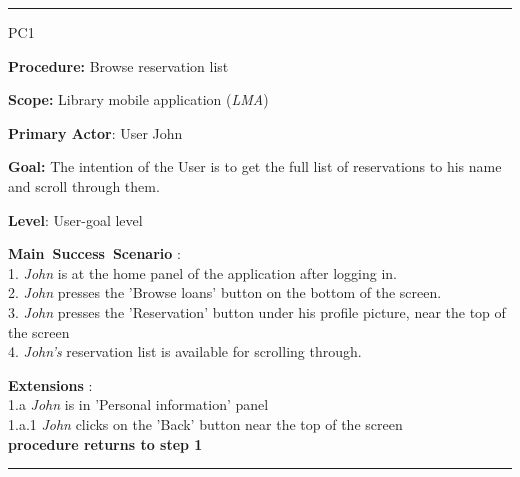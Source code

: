 \vspace{0.5cm}
\hrule
\begin{lyxlist}{PC1}
\small{
\item [\textbf{Procedure:}] Browse reservation list
\item [\textbf{Scope:}] Library mobile application (\emph{LMA})
\item [\textbf{Primary Actor}:] User John
\item [\textbf{Goal:}] The intention of the User is to get the full list of
reservations to his name and scroll through them.
\item [\textbf{Level}:] User-goal level
\item [\textbf{Main~Success~Scenario}]:\\
1. \emph{John} is at the home panel of the application after logging in.\\
2. \emph{John} presses the 'Browse loans' button on the bottom of the screen.\\
3. \emph{John} presses the 'Reservation' button under his profile picture, near
the top of the screen\\
4. \emph{John's} reservation list is available for scrolling
through.\\

\item [\textbf{Extensions}]:\\
1.a \emph{John} is in 'Personal information' panel\\
\hspace*{0.5cm} 1.a.1 \emph{John} clicks on the 'Back' button near the top of
the screen\\
\hspace*{0.5cm} \textbf{procedure returns to step 1}

}

\end{lyxlist}
\hrule


